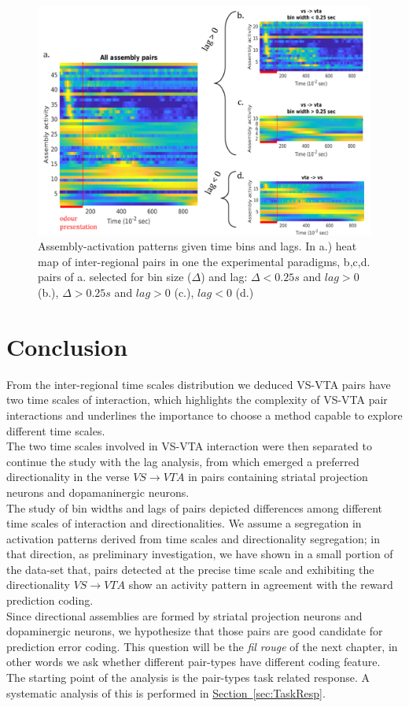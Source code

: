 \begin{figure}
    \centering
    \includegraphics[scale=0.45]{figures/AsActPerBinLag1.png}
    \caption{Assembly-activation patterns given time bins and lags. In a.) heat map of inter-regional pairs in one the experimental paradigms, b,c,d. pairs of a. selected for bin size ($\Delta$) and lag: $\Delta < 0.25 s$ and $lag > 0$ (b.), $\Delta > 0.25 s$ and $lag > 0$ (c.), $lag < 0$ (d.)}
    \label{fig:AsActBinLag}
\end{figure}
\section{Conclusion}
From the inter-regional time scales distribution we deduced VS-VTA pairs have two time scales of interaction, which highlights the complexity of VS-VTA pair interactions and underlines the importance to choose a method capable to explore different time scales.\\The two time scales involved in VS-VTA interaction were then separated to continue the study with the lag analysis, from which emerged a preferred directionality in the verse $VS\rightarrow VTA$ in pairs containing striatal projection neurons and dopamaninergic neurons.\\The study of bin widths and lags of pairs depicted differences among different time scales of interaction and directionalities. We assume a segregation in activation patterns derived from time scales and directionality segregation; in that direction, as preliminary investigation, we have shown in a small portion of the data-set that, pairs detected at the precise time scale and exhibiting the directionality $VS\rightarrow VTA$ show an activity pattern in agreement with the reward prediction coding.\\Since directional assemblies are formed by striatal projection neurons and dopaminergic neurons, we hypothesize that those pairs are good candidate for prediction error coding. This question will be the \textit{fil rouge} of the next chapter, in other words we ask whether different pair-types have different coding feature. The starting point of the analysis is the pair-types task related response. A systematic analysis of this is performed in \hyperref[sec:TaskResp]{Section~\ref*{sec:TaskResp}}.

